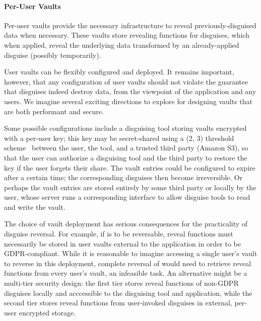 \paragraph{Per-User Vaults}

Per-user vaults provide the necessary infrastructure to reveal previously-disguised data when
necessary.
%
These vaults store revealing functions for disguises, which when applied, reveal the underlying
data transformed by an already-applied disguise (possibly temporarily).
%

%
User vaults can be flexibly configured and deployed. It remains important, however, that any
configuration of user vaults should not violate the guarantee that disguises indeed destroy data,
from the viewpoint of the application and any users.
We imagine several exciting directions to explore for designing vaults that are both
performant and secure.
%

%
Some possible configurations include a disguising tool storing vaults encrypted with a per-user key; this key
may be secret-shared using a (2, 3) threshold scheme~\cite{secretsharing} between the user, the
tool, and a trusted third party (\eg Amazon S3), so that the user can authorize a disguising tool and the
third party to restore the key if the user forgets their share.
%
The vault entries could be configured to expire after a certain time; the corresponding disguises
then become irreversible.
%
Or perhaps the vault entries are stored entirely by some third party or locally by the user, whose
server runs a corresponding interface to allow disguise tools to read and write the vault.

The choice of vault deployment has serious consequences for the practicality of disguise reversal.
For example, if \gdpr is to be reversable, reveal functions must necessarily be stored in user vaults external
to the application in order to be GDPR-compliant.
While it is reasonable to imagine accessing a single user's vault to reverse \gdpr in this
deployment, complete reversal of \ca would need to retrieve reveal functions from every user's vault, an infeasible task.
An alternative might be a multi-tier security design: the first tier stores reveal functions of
non-GDPR disguises locally and acccessible to the disguising tool and application, while the second
tier stores reveal functions from user-invoked disguises in external, per-user encrypted storage.

